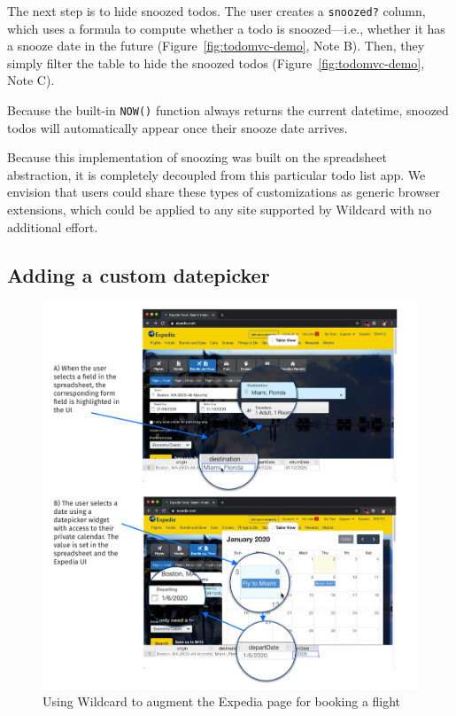 \documentclass[english]{programming}
\begin{document}
The next step is to hide snoozed todos. The user creates a
\texttt{snoozed?} column, which uses a formula to compute whether a todo
is snoozed---i.e., whether it has a snooze date in the future{
(Figure~\ref{fig:todomvc-demo}, Note B)}. Then, they simply filter the
table to hide the snoozed todos{ (Figure~\ref{fig:todomvc-demo}, Note
C)}.

Because the built-in \texttt{NOW()} function always returns the current
datetime, snoozed todos will automatically appear once their snooze date
arrives.

Because this implementation of snoozing was built on the spreadsheet
abstraction, it is completely decoupled from this particular todo list
app. We envision that users could share these types of customizations as
generic browser extensions, which could be applied to any site supported
by Wildcard with no additional effort.

\hypertarget{adding-a-custom-datepicker}{%
\subsection{Adding a custom
datepicker}\label{adding-a-custom-datepicker}}

\begin{figure}
\hypertarget{fig:expedia-demo}{%
\centering
\includegraphics{media/expedia-demo-300dpi.png}
\caption{Using Wildcard to augment the Expedia page for booking a
flight}\label{fig:expedia-demo}
}
\end{figure}
\end{document}
